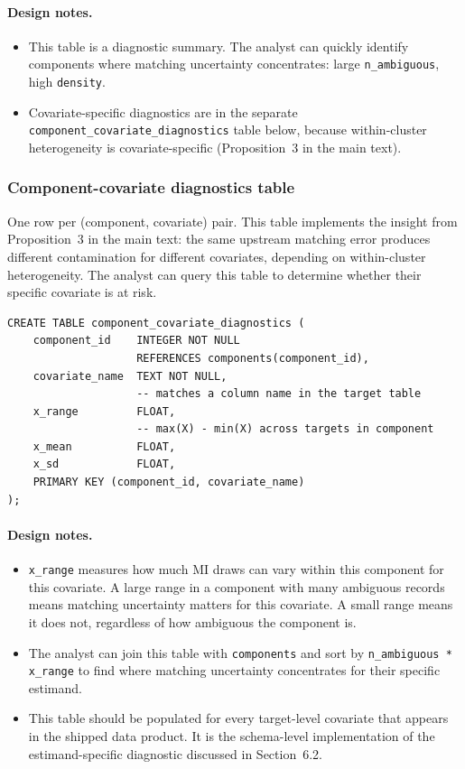 \paragraph{Design notes.}
\begin{itemize}
    \item This table is a diagnostic summary. The analyst can quickly identify components where matching uncertainty concentrates: large \texttt{n\_ambiguous}, high \texttt{density}.
    \item Covariate-specific diagnostics are in the separate \texttt{component\_covariate\_diagnostics} table below, because within-cluster heterogeneity is covariate-specific (Proposition~3 in the main text).
\end{itemize}

\subsubsection{Component-covariate diagnostics table}

One row per (component, covariate) pair. This table implements the insight from Proposition~3 in the main text: the same upstream matching error produces different contamination for different covariates, depending on within-cluster heterogeneity. The analyst can query this table to determine whether their specific covariate is at risk.

\begin{lstlisting}[style=sql]
CREATE TABLE component_covariate_diagnostics (
    component_id    INTEGER NOT NULL
                    REFERENCES components(component_id),
    covariate_name  TEXT NOT NULL,
                    -- matches a column name in the target table
    x_range         FLOAT,
                    -- max(X) - min(X) across targets in component
    x_mean          FLOAT,
    x_sd            FLOAT,
    PRIMARY KEY (component_id, covariate_name)
);
\end{lstlisting}

\paragraph{Design notes.}
\begin{itemize}
    \item \texttt{x\_range} measures how much MI draws can vary within this component for this covariate. A large range in a component with many ambiguous records means matching uncertainty matters for this covariate. A small range means it does not, regardless of how ambiguous the component is.
    \item The analyst can join this table with \texttt{components} and sort by \texttt{n\_ambiguous * x\_range} to find where matching uncertainty concentrates for their specific estimand.
    \item This table should be populated for every target-level covariate that appears in the shipped data product. It is the schema-level implementation of the estimand-specific diagnostic discussed in Section~6.2.
\end{itemize}

